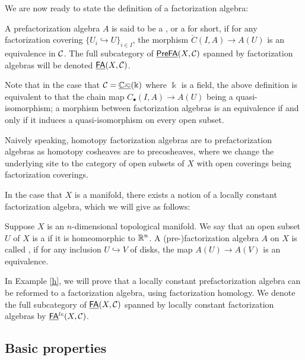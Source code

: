 \documentclass[twoside]{article}
\begin{document}
We are now ready to state the definition of a factorization algebra:

\begin{definition}
    A prefactorization algebra $A$ is said to be a , or a  for short, if for any 
    factorization covering $\{U_i\hookrightarrow U\}_{i\in I}$, the morphism
    $\check{C}(I,A)\to A(U)$ is an equivalence in $\cal C$.
    The full subcategory of $\underline{\smash{\mathsf{PreFA}}}(X,\cal C)$ spanned by factorization algebras
    will be denoted $\underline{\smash{\mathsf{FA}}}(X,\cal C)$. 
\end{definition}

Note that in the case that ${\cal C}=\underline{\mathbb{Ch}}(\Bbbk)$ where $\Bbbk$ is a field,
the above definition is equivalent to that the chain map
$C_\bullet(I,A)\to A(U)$ being a quasi-isomorphism; a morphism between
factorization algebras is an equivalence if and only if it induces a
quasi-isomorphism on every open subset.

Naively speaking, homotopy factorization algebras are to prefactorization
algebras as homotopy cosheaves are to precosheaves, where we change the
underlying site to the category of open subsets of $X$ with open coverings
being factorization coverings.

In the case that $X$ is a manifold, there exists a notion of a locally constant
factorization algebra, which we will give as follows:

\begin{definition}
    Suppose $X$ is an $n$-dimensional topological manifold. We say that an open
    subset $U$ of $X$ is a  if it is homeomorphic to $\mathbb{R}^n$.
    A (pre-)factorization algebra $A$ on $X$ is called ,
    if for any inclusion $U\hookrightarrow V$ of disks, the map $A(U)\to A(V)$
    is an equivalence.
\end{definition}

\begin{remark}\label{g}
    In Example \ref{h}, we will prove that a locally constant prefactorization
    algebra can be reformed to a factorization algebra, using 
    factorization homology. We denote the full subcategory of $\underline{\smash{\mathsf{FA}}}(X,\cal C)$
    spanned by locally constant factorization algebras by $\underline{\smash{\mathsf{FA}}}^{lc}(X,\cal C)$.
\end{remark}

\subsection{Basic properties}
\end{document}

